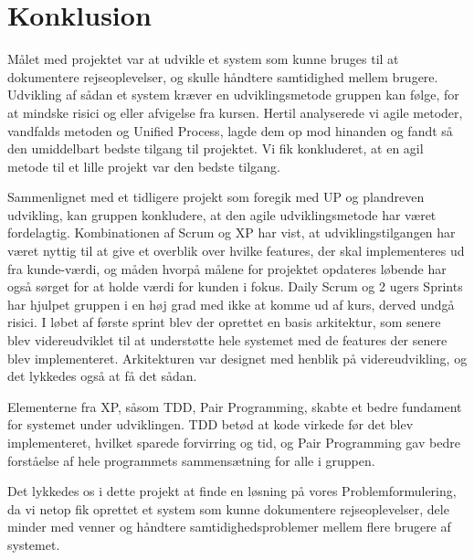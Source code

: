 \chapter{Konklusion}\label{ch:Konklusion}

Målet med projektet var at udvikle et system som kunne bruges til at dokumentere rejseoplevelser, og skulle håndtere samtidighed mellem brugere. Udvikling af sådan et system kræver en udviklingsmetode gruppen kan følge, for at mindske risici og eller afvigelse fra kursen. Hertil analyserede vi agile metoder, vandfalds metoden og Unified Process, lagde dem op mod hinanden og fandt så den umiddelbart bedste tilgang til projektet. Vi fik konkluderet, at en agil metode til et lille projekt var den bedste tilgang. 

Sammenlignet med et tidligere projekt som foregik med UP og plandreven udvikling, kan gruppen konkludere, at den agile udviklingsmetode har været fordelagtig. Kombinationen af Scrum og XP har vist, at udviklingstilgangen har været nyttig til at give et overblik over hvilke features, der skal implementeres ud fra kunde-værdi, og måden hvorpå målene for projektet opdateres løbende har også sørget for at holde værdi for kunden i fokus. Daily Scrum og 2 ugers Sprints har hjulpet gruppen i en høj grad med ikke at komme ud af kurs, derved undgå risici. 
I løbet af første sprint blev der oprettet en basis arkitektur, som senere blev videreudviklet til at understøtte hele systemet med de features der senere blev implementeret. Arkitekturen var designet med henblik på videreudvikling, og det lykkedes også at få det sådan.

Elementerne fra XP, såsom TDD, Pair Programming, skabte et bedre fundament for systemet under udviklingen. TDD betød at kode virkede før det blev implementeret, hvilket sparede forvirring og tid, og Pair Programming gav bedre forståelse af hele programmets sammensætning for alle i gruppen.

Det lykkedes os i dette projekt at finde en løsning på vores Problemformulering, da vi netop fik oprettet et system som kunne dokumentere rejseoplevelser, dele minder med venner og håndtere samtidighedsproblemer mellem flere brugere af systemet.

